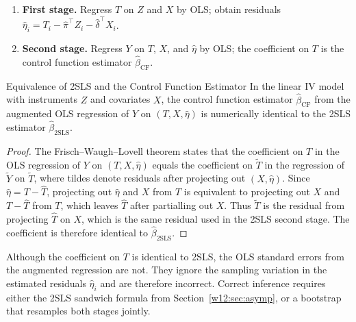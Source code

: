 \documentclass[master.tex]{subfiles}
\begin{document}
\begin{tcolorbox}[defstyle, title={Control Function Estimator (Linear Case)}]
\label{w12:box:cf-linear}
\begin{enumerate}
  \item \textbf{First stage.}  Regress $T$ on $Z$ and $X$ by OLS; obtain
    residuals $\hat\eta_i = T_i - \hat\pi^\top Z_i - \hat\delta^\top X_i$.
  \item \textbf{Second stage.}  Regress $Y$ on $T$, $X$, and $\hat\eta$
    by OLS; the coefficient on $T$ is the control function estimator
    $\hat\beta_{\mathrm{CF}}$.
\end{enumerate}
\end{tcolorbox}

\begin{thm}{Equivalence of 2SLS and the Control Function Estimator}
\label{w12:thm:cf-equiv}
In the linear IV model with instruments $Z$ and covariates $X$, the
control function estimator $\hat\beta_{\mathrm{CF}}$ from the augmented
OLS regression of $Y$ on $(T, X, \hat\eta)$ is numerically identical to
the 2SLS estimator $\hat\beta_{\mathrm{2SLS}}$.
\end{thm}

\begin{proof}
The Frisch--Waugh--Lovell theorem states that the coefficient on $T$ in
the OLS regression of $Y$ on $(T, X, \hat\eta)$ equals the coefficient
on $\tilde{T}$ in the regression of $\tilde{Y}$ on $\tilde{T}$, where
tildes denote residuals after projecting out $(X, \hat\eta)$.  Since
$\hat\eta = T - \hat{T}$, projecting out $\hat\eta$ and $X$ from $T$
is equivalent to projecting out $X$ and $T - \hat{T}$ from $T$, which
leaves $\hat{T}$ after partialling out $X$.  Thus $\tilde{T}$ is the
residual from projecting $\hat{T}$ on $X$, which is the same residual
used in the 2SLS second stage.  The coefficient is therefore identical
to $\hat\beta_{\mathrm{2SLS}}$.
\end{proof}

\begin{remark}
Although the coefficient on $T$ is identical to 2SLS, the OLS standard
errors from the augmented regression are not.  They ignore the sampling
variation in the estimated residuals $\hat\eta_i$ and are therefore
incorrect.  Correct inference requires either the 2SLS sandwich formula
from Section~\ref{w12:sec:asymp}, or a bootstrap that resamples both
stages jointly.
\end{remark}
\end{document}
